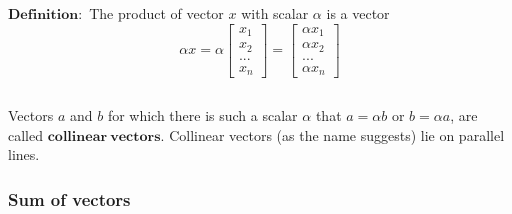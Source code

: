 \documentclass[11pt]{article}
\begin{document}
    $\mathbf{Definition:}$ The product of vector $x$ with scalar $\alpha$ is a vector
$$$$
$$
\alpha x = \alpha \begin{bmatrix}x_1 \\ x_2 \\ ... \\ x_n\end{bmatrix} = 
            \begin{bmatrix} \alpha x_1 \\ \alpha x_2 \\ ... \\ \alpha x_n\end{bmatrix}
$$

$$$$

Vectors $a$ and $b$ for which there is such a scalar $\alpha$ that $a = \alpha b$ or $b = \alpha a$, are
called $\mathbf{collinear~vectors}$. Collinear vectors (as the name suggests) lie on parallel lines.

    
    \hypertarget{sum-of-vectors}{%
\subsubsection{Sum of vectors}\label{sum-of-vectors}}
\end{document}
